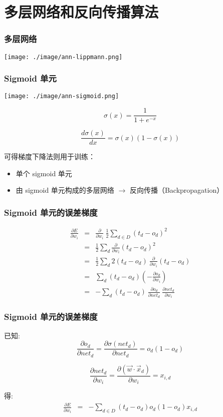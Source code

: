 \documentclass{beamer}
\begin{document}
\section{多层网络和反向传播算法}
\label{sec-3}
\begin{frame}
\frametitle{多层网络}
\label{sec-3-1}

  \texttt{[image: ./image/ann-lippmann.png]}
\end{frame}
\begin{frame}
\frametitle{Sigmoid 单元}
\label{sec-3-2}


\texttt{[image: ./image/ann-sigmoid.png]}

$$\sigma(x)= \frac{1}{1 + e^{-x}} $$

$$\frac{d \sigma(x)}{dx} = \sigma(x) (1 - \sigma(x))$$


可得梯度下降法则用于训练：
\begin{itemize}
\item 单个 sigmoid 单元
\item 由 sigmoid 单元构成的多层网络  $\rightarrow$ 反向传播（Backpropagation）
\end{itemize}
\end{frame}
\begin{frame}
\frametitle{Sigmoid 单元的误差梯度}
\label{sec-3-3}


\begin{eqnarray}
\frac{\partial E}{\partial w_{i}} & = & \frac{\partial}{\partial w_{i}}\ 
\frac{1}{2}\sum_{d\in D}(t_{d} - o_{d})^{2} \nonumber\\
 & = & \frac{1}{2}\sum_{d}\frac{\partial}{\partial w_{i}}
  (t_{d} - o_{d})^{2} \nonumber\\
 & = & \frac{1}{2}\sum_{d} 2 (t_{d} - o_{d}) \ 
\frac{\partial}{\partial w_{i}}(t_{d} - o_{d}) \nonumber\\
 & = & \sum_{d} (t_{d} - o_{d}) \left( - \frac{\partial o_{d}}{\partial
w_{i}}\right) \nonumber\\
& = & - \sum_{d} (t_{d} - o_{d})\ \frac{\partial o_{d}}{\partial
net_{d}}\ \frac{\partial net_{d}}{\partial w_{i}} \nonumber
\end{eqnarray}
\end{frame}
\begin{frame}
\frametitle{Sigmoid 单元的误差梯度}
\label{sec-3-4}


已知:
\[\frac{\partial o_{d}}{\partial net_{d}} = \frac{\partial
\sigma(net_{d})}{\partial net_{d}} =  o_{d}(1 -  o_{d})  \]

\[\frac{\partial net_{d}}{\partial w_{i}} = \frac{\partial (\vec{w} \cdot
\vec{x}_{d})}{\partial w_{i}} = x_{i,d} \]

得:
\begin{eqnarray}
\frac{\partial E}{\partial w_{i}} & = & - \sum_{d \in D} (t_{d} - o_{d})
o_{d}(1-o_{d}) x_{i,d} \nonumber
\end{eqnarray}
\end{frame}
\end{document}
